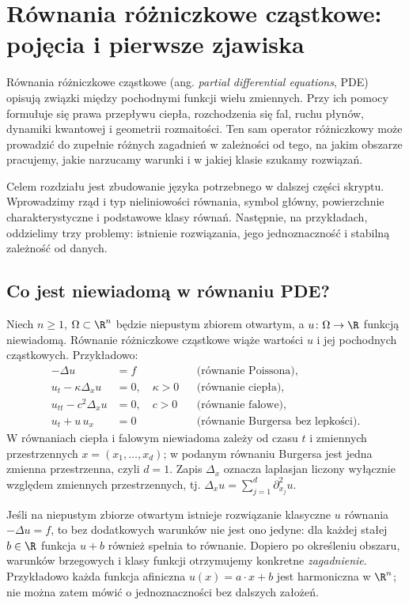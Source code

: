 \chapter[Wprowadzenie do PDE]{Równania różniczkowe cząstkowe: pojęcia i pierwsze zjawiska}
\label{chap:pde-intro}

Równania różniczkowe cząstkowe (ang. \emph{partial differential equations}, PDE)
opisują związki między pochodnymi funkcji wielu zmiennych. Przy ich pomocy
formułuje się prawa przepływu ciepła, rozchodzenia się fal, ruchu płynów,
dynamiki kwantowej i geometrii rozmaitości. Ten sam operator różniczkowy
może prowadzić do zupełnie różnych zagadnień w zależności od tego, na
jakim obszarze pracujemy, jakie narzucamy warunki i w jakiej klasie
szukamy rozwiązań.

Celem rozdziału jest zbudowanie języka potrzebnego w dalszej części
skryptu. Wprowadzimy rząd i typ nieliniowości równania, symbol główny,
powierzchnie charakterystyczne i podstawowe klasy równań. Następnie,
na przykładach, oddzielimy trzy problemy: istnienie rozwiązania,
jego jednoznaczność i stabilną zależność od danych.

\section{Co jest niewiadomą w równaniu PDE?}
\label{sec:pde-unknown}

Niech $n\geq1$, $\Omega\subset\R^n$ będzie niepustym zbiorem otwartym,
a $u\colon\Omega\to\R$ funkcją niewiadomą. Równanie różniczkowe
cząstkowe wiąże wartości $u$ i jej pochodnych cząstkowych. Przykładowo:
\begin{align}
 -\Delta u&=f &&\text{(równanie Poissona)},\label{eq:poisson-intro}\\
 u_t-\kappa\Delta_xu&=0,\quad \kappa>0
 &&\text{(równanie ciepła)},\label{eq:heat-intro}\\
 u_{tt}-c^2\Delta_xu&=0,\quad c>0
 &&\text{(równanie falowe)},\label{eq:wave-intro}\\
 u_t+u\,u_x&=0 &&\text{(równanie Burgersa bez lepkości)}.
 \label{eq:burgers-intro}
\end{align}
W równaniach ciepła i falowym niewiadoma zależy od czasu $t$ i
zmiennych przestrzennych $x=(x_1,\ldots,x_d)$; w podanym równaniu
Burgersa jest jedna zmienna przestrzenna, czyli $d=1$. Zapis $\Delta_x$ oznacza
laplasjan liczony wyłącznie względem zmiennych przestrzennych, tj.
$\Delta_xu=\sum_{j=1}^d\partial_{x_j}^2u$.

\begin{uwaga}
Jeśli na niepustym zbiorze otwartym istnieje rozwiązanie klasyczne
$u$ równania $-\Delta u=f$, to bez dodatkowych warunków nie jest
ono jedyne: dla każdej stałej $b\in\R$ funkcja $u+b$ również
spełnia to równanie. Dopiero po
określeniu obszaru, warunków brzegowych i klasy funkcji otrzymujemy
konkretne \emph{zagadnienie}. Przykładowo każda funkcja afiniczna
$u(x)=a\cdot x+b$ jest harmoniczna w $\R^n$; nie można zatem mówić
o jednoznaczności bez dalszych założeń.
\end{uwaga}

